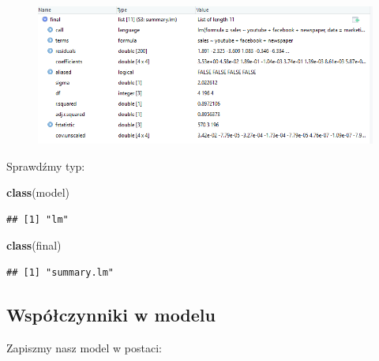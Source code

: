 \documentclass[]{article}
\newenvironment{Shaded}{\begin{snugshade}}{\end{snugshade}}
\newcommand{\KeywordTok}[1]{\textcolor[rgb]{0.13,0.29,0.53}{\textbf{#1}}}
\newcommand{\NormalTok}[1]{#1}
\begin{document}
\begin{figure}
\centering
\includegraphics{summarylm.png}
\caption{}
\end{figure}

Sprawdźmy typ:

\begin{Shaded}
\begin{Highlighting}[]
\KeywordTok{class}\NormalTok{(model)}
\end{Highlighting}
\end{Shaded}

\begin{verbatim}
## [1] "lm"
\end{verbatim}

\begin{Shaded}
\begin{Highlighting}[]
\KeywordTok{class}\NormalTok{(final)}
\end{Highlighting}
\end{Shaded}

\begin{verbatim}
## [1] "summary.lm"
\end{verbatim}

\subsection{Współczynniki w modelu}\label{wspoczynniki-w-modelu}

Zapiszmy nasz model w postaci:
\end{document}
